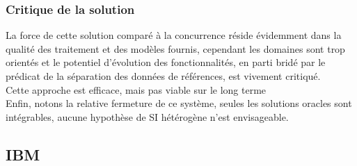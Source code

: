 \subsubsection{Critique de la solution}

La force de cette solution comparé à la concurrence réside évidemment dans la qualité des traitement et des modèles fournis, cependant les domaines sont trop orientés et le potentiel d'évolution des fonctionnalités, en parti bridé par le prédicat de la séparation des données de références, est vivement critiqué.\\
Cette approche est efficace, mais pas viable sur le long terme\\ 
Enfin, notons la relative fermeture de ce système, seules les solutions oracles sont intégrables, aucune hypothèse de SI hétérogène n'est envisageable.

\subsection{IBM}
